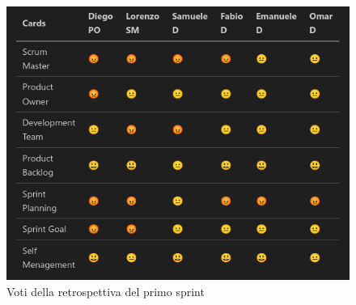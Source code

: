 \documentclass{article}
\begin{document}
\begin{figure}[H]
    \centering
    \includegraphics[width=1\textwidth]{retrospettiva1}
    \caption{Voti della retrospettiva del primo sprint}
    \label{fig:retrospettiva1}
\end{figure}
\end{document}
